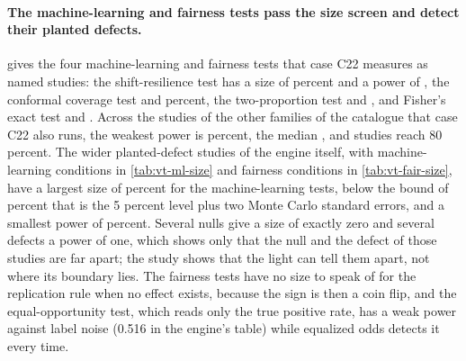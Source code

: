 \paragraph{The machine-learning and fairness tests pass the size screen and detect their planted defects.}  gives the four machine-learning and fairness tests that case C22 measures as named studies: the shift-resilience test has a size of \vtShiftSize{} percent and a power of \vtShiftPow{}, the conformal coverage test \vtConfSize{} and \vtConfPow{} percent, the two-proportion test \vtZSize{} and \vtZPow{}, and Fisher's exact test \vtFisherSize{} and \vtFisherPow{}. Across the \vtOtherStudies{} studies of the other families of the catalogue that case C22 also runs, the weakest power is \vtOtherPowMin{} percent,
the median \vtOtherPowMed{}, and \vtOtherAboveEightZero{} studies reach 80 percent. The wider planted-defect studies of the engine itself, with \vtMlConditions{} machine-learning conditions in \cref{tab:vt-ml-size} and \vtFairConditions{} fairness conditions in \cref{tab:vt-fair-size}, have a largest size of \vtMlSizeMax{} percent for the machine-learning tests, below the bound of \vtMlBoundTwoSe{} percent
that is the 5 percent level plus two Monte Carlo standard errors, and a smallest power of \vtMlPowerMin{} percent. Several nulls give a size of exactly zero and several defects a power of one, which shows only that the null and the defect of those studies are far apart; the study shows that the light can tell them apart, not where its boundary lies. The fairness tests have no size to speak of for the replication rule
when no effect exists, because the sign is then a coin flip, and the equal-opportunity test, which reads only the true positive rate, has a weak power against label noise (0.516 in the engine's table) while equalized odds detects it every time.





